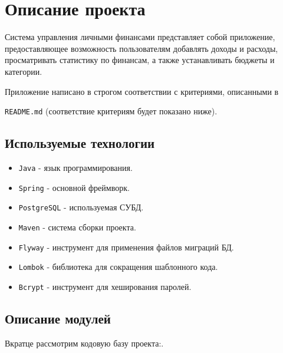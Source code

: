 \documentclass[a4paper, 14pt]{article}
\begin{document}

\iffalse
\section{Описание проекта}

Система управления личными финансами представляет собой приложение, предоставляющее возможность пользователям добавлять доходы и расходы, просматривать статистику по финансам, а также устанавливать бюджеты и категории.

Приложение написано в строгом соответствии с критериями, описанными в

\texttt{README.md} (соответствие критериям будет показано ниже).

\subsection{Используемые технологии}

\begin{itemize}
	\item \texttt{Java} - язык программирования.
	\item \texttt{Spring} - основной фреймворк.
	\item \texttt{PostgreSQL} - используемая СУБД.
	\item \texttt{Maven} - система сборки проекта.
	\item \texttt{Flyway} - инструмент для применения файлов миграций БД.
	\item \texttt{Lombok} - библиотека для сокращения шаблонного кода.
	\item \texttt{Bcrypt} - инструмент для хеширования паролей.
\end{itemize}

\subsection{Описание модулей}

Вкратце рассмотрим кодовую базу проекта:.
\end{document}

